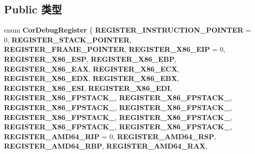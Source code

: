 \subsection*{Public 类型}
\begin{DoxyCompactItemize}
\item 
\mbox{\label{interface_i_cor_debug_register_set_a30f2ef4d5a657f5aa003b9c887020eb2}} 
enum {\bfseries Cor\+Debug\+Register} \{ \newline
{\bfseries R\+E\+G\+I\+S\+T\+E\+R\+\_\+\+I\+N\+S\+T\+R\+U\+C\+T\+I\+O\+N\+\_\+\+P\+O\+I\+N\+T\+ER} = 0, 
{\bfseries R\+E\+G\+I\+S\+T\+E\+R\+\_\+\+S\+T\+A\+C\+K\+\_\+\+P\+O\+I\+N\+T\+ER}, 
{\bfseries R\+E\+G\+I\+S\+T\+E\+R\+\_\+\+F\+R\+A\+M\+E\+\_\+\+P\+O\+I\+N\+T\+ER}, 
{\bfseries R\+E\+G\+I\+S\+T\+E\+R\+\_\+\+X86\+\_\+\+E\+IP} = 0, 
\newline
{\bfseries R\+E\+G\+I\+S\+T\+E\+R\+\_\+\+X86\+\_\+\+E\+SP}, 
{\bfseries R\+E\+G\+I\+S\+T\+E\+R\+\_\+\+X86\+\_\+\+E\+BP}, 
{\bfseries R\+E\+G\+I\+S\+T\+E\+R\+\_\+\+X86\+\_\+\+E\+AX}, 
{\bfseries R\+E\+G\+I\+S\+T\+E\+R\+\_\+\+X86\+\_\+\+E\+CX}, 
\newline
{\bfseries R\+E\+G\+I\+S\+T\+E\+R\+\_\+\+X86\+\_\+\+E\+DX}, 
{\bfseries R\+E\+G\+I\+S\+T\+E\+R\+\_\+\+X86\+\_\+\+E\+BX}, 
{\bfseries R\+E\+G\+I\+S\+T\+E\+R\+\_\+\+X86\+\_\+\+E\+SI}, 
{\bfseries R\+E\+G\+I\+S\+T\+E\+R\+\_\+\+X86\+\_\+\+E\+DI}, 
\newline
{\bfseries R\+E\+G\+I\+S\+T\+E\+R\+\_\+\+X86\+\_\+\+F\+P\+S\+T\+A\+C\+K\+\_}, 
{\bfseries R\+E\+G\+I\+S\+T\+E\+R\+\_\+\+X86\+\_\+\+F\+P\+S\+T\+A\+C\+K\+\_}, 
{\bfseries R\+E\+G\+I\+S\+T\+E\+R\+\_\+\+X86\+\_\+\+F\+P\+S\+T\+A\+C\+K\+\_}, 
{\bfseries R\+E\+G\+I\+S\+T\+E\+R\+\_\+\+X86\+\_\+\+F\+P\+S\+T\+A\+C\+K\+\_}, 
\newline
{\bfseries R\+E\+G\+I\+S\+T\+E\+R\+\_\+\+X86\+\_\+\+F\+P\+S\+T\+A\+C\+K\+\_}, 
{\bfseries R\+E\+G\+I\+S\+T\+E\+R\+\_\+\+X86\+\_\+\+F\+P\+S\+T\+A\+C\+K\+\_}, 
{\bfseries R\+E\+G\+I\+S\+T\+E\+R\+\_\+\+X86\+\_\+\+F\+P\+S\+T\+A\+C\+K\+\_}, 
{\bfseries R\+E\+G\+I\+S\+T\+E\+R\+\_\+\+X86\+\_\+\+F\+P\+S\+T\+A\+C\+K\+\_}, 
\newline
{\bfseries R\+E\+G\+I\+S\+T\+E\+R\+\_\+\+A\+M\+D64\+\_\+\+R\+IP} = 0, 
{\bfseries R\+E\+G\+I\+S\+T\+E\+R\+\_\+\+A\+M\+D64\+\_\+\+R\+SP}, 
{\bfseries R\+E\+G\+I\+S\+T\+E\+R\+\_\+\+A\+M\+D64\+\_\+\+R\+BP}, 
{\bfseries R\+E\+G\+I\+S\+T\+E\+R\+\_\+\+A\+M\+D64\+\_\+\+R\+AX}, 
\newline

\end{DoxyCompactItemize}
